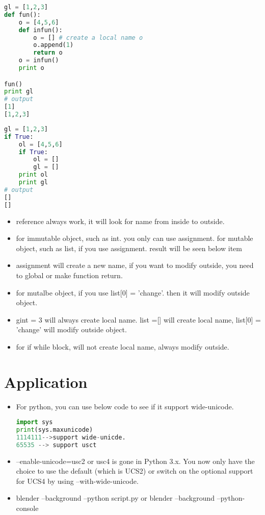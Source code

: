 \documentclass[a4paper,12pt,twoside]{book}
\begin{document}
\begin{lstlisting}[frame=single, language=python]
gl = [1,2,3]
def fun():
	o = [4,5,6]
	def infun():
		o = [] # create a local name o
		o.append(1)
		return o
	o = infun()
	print o

fun()
print gl
# output 
[1]
[1,2,3]
\end{lstlisting}  


\begin{lstlisting}[frame=single, language=python]
gl = [1,2,3]
if True:
	ol = [4,5,6]
	if True:
		ol = []
		gl = []
	print ol
	print gl
# output 
[]
[]
\end{lstlisting}  





\begin{itemize}
		\item reference always work, it will look for name from inside to outside.
		\item for immutable object, such as int. you only can use assignment. for mutable object, such as list, if you use assignment. result will be seen below item
		\item assignment will create a new name, if you want to modify outside, you need to global or make function return.
		\item for mutalbe object, if you use list[0] = 'change'. then it will modify outside object.
		\item gint = 3 will always create local name. list =[] will create local name, list[0] = 'change' will modify outside object.
		\item for if while block, will not create local name, always modify outside. 
\end{itemize}

\section{Application}
\begin{itemize}
		\item For python, you can use below code to see if it support wide-unicode.
\begin{lstlisting}[frame=single, language=python]
import sys
print(sys.maxunicode) 
1114111-->support wide-unicde.
65535 --> support usct
\end{lstlisting} 
		\item --enable-unicode=usc2 or usc4 is gone in Python 3.x. You now only have the choice to use the default (which is UCS2) or switch on the optional support for UCS4 by using --with-wide-unicode.

		\item blender --background --python script.py or blender --background --python-console

\end{itemize}
\end{document}
